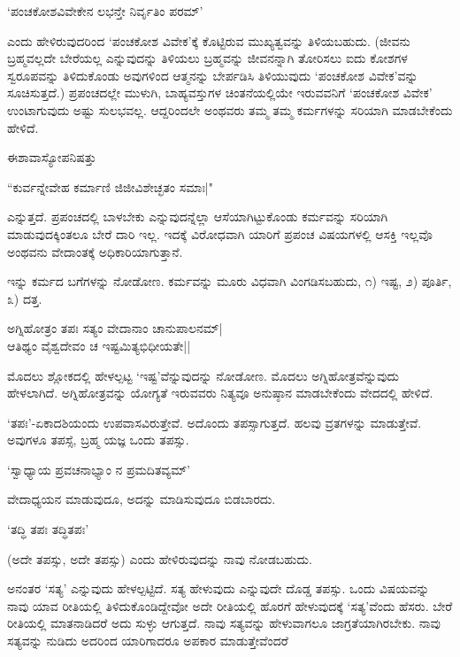 \begin{shloka}
`ಪಂಚಕೋಶವಿವೇಕೇನ ಲಭನ್ತೇ ನಿರ್ವೃತಿಂ ಪರಮ್'
\end{shloka}

ಎಂದು ಹೇಳಿರುವುದರಿಂದ `ಪಂಚಕೋಶ ವಿವೇಕ'ಕ್ಕೆ ಕೊಟ್ಟಿರುವ ಮುಖ್ಯತ್ವವನ್ನು ತಿಳಿಯಬಹುದು. (ಜೀವನು ಬ್ರಹ್ಮವಲ್ಲದೇ ಬೇರೆಯಲ್ಲ ಎನ್ನುವುದನ್ನು ತಿಳಿಯಲು ಬ್ರಹ್ಮವನ್ನು ಜೀವನನ್ನಾಗಿ ತೋರಿಸಲು ಐದು ಕೋಶಗಳ ಸ್ವರೂಪವನ್ನು ತಿಳಿದುಕೊಂಡು ಅವುಗಳಿಂದ ಆತ್ಮನನ್ನು ಬೇರ್ಪಡಿಸಿ ತಿಳಿಯುವುದು `ಪಂಚಕೋಶ ವಿವೇಕ'ವನ್ನು ಸೂಚಿಸುತ್ತದೆ.) ಪ್ರಪಂಚದಲ್ಲೇ ಮುಳುಗಿ, ಬಾಹ್ಯವಸ್ತುಗಳ ಚಿಂತನೆಯಲ್ಲಿಯೇ ಇರುವವನಿಗೆ `ಪಂಚಕೋಶ ವಿವೇಕ' ಉಂಟಾಗುವುದು ಅಷ್ಟು ಸುಲಭವಲ್ಲ. ಆದ್ದರಿಂದಲೇ ಅಂಥವರು ತಮ್ಮ ತಮ್ಮ ಕರ್ಮಗಳನ್ನು ಸರಿಯಾಗಿ ಮಾಡಬೇಕೆಂದು ಹೇಳಿದೆ.

ಈಶಾವಾಸ್ಯೋಪನಿಷತ್ತು

\begin{shloka}
``ಕುರ್ವನ್ನೇವೇಹ ಕರ್ಮಾಣಿ ಜಿಜೀವಿಶೇಚ್ಛತಂ ಸಮಾಃ|"
\end{shloka}

ಎನ್ನುತ್ತದೆ. ಪ್ರಪಂಚದಲ್ಲಿ ಬಾಳಬೇಕು ಎನ್ನುವುದನ್ನೆಲ್ಲಾ ಆಸೆಯಾಗಿಟ್ಟುಕೊಂಡು ಕರ್ಮವನ್ನು ಸರಿಯಾಗಿ ಮಾಡುವುದಕ್ಕಿಂತಲೂ ಬೇರೆ ದಾರಿ ಇಲ್ಲ. ಇದಕ್ಕೆ ವಿರೋಧವಾಗಿ ಯಾರಿಗೆ ಪ್ರಪಂಚ ವಿಷಯಗಳಲ್ಲಿ ಆಸಕ್ತಿ ಇಲ್ಲವೊ ಅಂಥವನು ವೇದಾಂತಕ್ಕೆ ಅಧಿಕಾರಿಯಾಗುತ್ತಾನೆ.

ಇನ್ನು ಕರ್ಮದ ಬಗೆಗಳನ್ನು ನೋಡೋಣ. ಕರ್ಮವನ್ನು ಮೂರು ವಿಧವಾಗಿ ವಿಂಗಡಿಸಬಹುದು, ೧) ಇಷ್ಟ, ೨) ಪೂರ್ತಿ, ೩) ದತ್ತ.

\begin{shloka}
ಅಗ್ನಿಹೋತ್ರಂ ತಪಃ ಸತ್ಯಂ ವೇದಾನಾಂ ಚಾನುಪಾಲನಮ್|\\
ಆತಿಥ್ಯಂ ವೈಶ್ವದೇವಂ ಚ ಇಷ್ಟಮಿತ್ಯಭಿಧೀಯತೇ||
\end{shloka}

ಮೊದಲು ಶ್ಲೋಕದಲ್ಲಿ ಹೇಳಲ್ಪಟ್ಟ `ಇಷ್ಟ'ವೆನ್ನುವುದನ್ನು ನೋಡೋಣ. ಮೊದಲು ಅಗ್ನಿಹೋತ್ರವೆನ್ನುವುದು ಹೇಳಲಾಗಿದೆ. ಅಗ್ನಿಹೋತ್ರವನ್ನು ಯೋಗ್ಯತೆ ಇರುವವರು ನಿತ್ಯವೂ ಅನುಷ್ಠಾನ ಮಾಡಬೇಕೆಂದು ವೇದದಲ್ಲಿ ಹೇಳಿದೆ.

`ತಪಃ'-ಏಕಾದಶಿಯಂದು ಉಪವಾಸವಿರುತ್ತೇವೆ. ಅದೊಂದು ತಪಸ್ಸಾಗುತ್ತದೆ. ಹಲವು ವ್ರತಗಳನ್ನು ಮಾಡುತ್ತೇವೆ. ಅವುಗಳೂ ತಪಸ್ಸೆ, ಬ್ರಹ್ಮ ಯಜ್ಞ ಒಂದು ತಪಸ್ಸು.

\begin{shloka}
`ಸ್ವಾಧ್ಯಾಯ ಪ್ರವಚನಾಭ್ಯಾಂ ನ ಪ್ರಮದಿತವ್ಯಮ್'
\end{shloka}

ವೇದಾಧ್ಯಯನ ಮಾಡುವುದೂ, ಅದನ್ನು ಮಾಡಿಸುವುದೂ ಬಿಡಬಾರದು.

\begin{shloka}
`ತದ್ಧಿ ತಪಃ ತದ್ಧಿತಪಃ'
\end{shloka}

(ಅದೇ ತಪಸ್ಸು, ಅದೇ ತಪಸ್ಸು) ಎಂದು ಹೇಳಿರುವುದನ್ನು ನಾವು ನೋಡಬಹುದು.

ಅನಂತರ `ಸತ್ಯ' ಎನ್ನುವುದು ಹೇಳಲ್ಪಟ್ಟಿದೆ. ಸತ್ಯ ಹೇಳುವುದು ಎನ್ನುವುದೇ ದೊಡ್ಡ ತಪಸ್ಸು. ಒಂದು ವಿಷಯವನ್ನು ನಾವು ಯಾವ ರೀತಿಯಲ್ಲಿ ತಿಳಿದುಕೊಂಡಿದ್ದೇವೋ ಅದೇ ರೀತಿಯಲ್ಲಿ ಹೊರಗೆ ಹೇಳುವುದಕ್ಕೆ `ಸತ್ಯ'ವೆಂದು ಹೆಸರು. ಬೇರೆ ರೀತಿಯಲ್ಲಿ ಮಾತನಾಡಿದರೆ ಅದು ಸುಳ್ಳು ಆಗುತ್ತದೆ. ನಾವು ಸತ್ಯವನ್ನು ಹೇಳುವಾಗಲೂ ಜಾಗ್ರತೆಯಾಗಿರಬೇಕು. ನಾವು ಸತ್ಯವನ್ನು ನುಡಿದು ಅದರಿಂದ ಯಾರಿಗಾದರೂ ಅಪಕಾರ ಮಾಡುತ್ತೇವೆಂದರೆ

